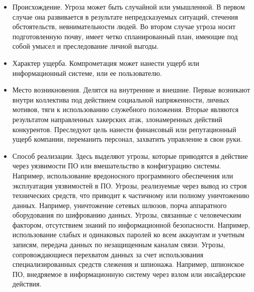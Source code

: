\begin{itemize} 

	\item Происхождение. Угроза может быть случайной или умышленной. В первом случае она развивается в результате непредсказуемых ситуаций, стечения обстоятельств, невнимательности людей. Во втором случае угроза носит подготовленную почву, имеет четко спланированный план, имеющие под собой умысел и преследование личной выгоды.

	\item Характер ущерба. Компрометация может нанести ущерб или информационный системе, или ее пользователю.

	\item Место возникновения. Делятся на внутренние и внешние. Первые возникают внутри коллектива под действием социальной напряженности, личных мотивов, тяги к использованию служебного положения. Вторые являются результатом направленных хакерских атак, злонамеренных действий конкурентов. Преследуют цель нанести финансовый или репутационный ущерб компании, переманить персонал, захватить управление в свои руки.

	\item Способ реализации. Здесь выделяют угрозы, которые приводятся в действие через уязвимости ПО или вмешательство в конфигурацию системы. Например, использование вредоносного программного обеспечения или эксплуатация уязвимостей в ПО. Угрозы, реализуемые через вывод из строя технических средств, что приводит к частичному или полному уничтожению данных. Например, уничтожение сетевых шлюзов, порча аппаратного оборудования по шифрованию данных. Угрозы, связанные с человеческим фактором, отсутствием знаний по информационной безопасности. Например, использование слабых и одинаковых паролей ко всем аккаунтам и учетным записям, передача данных по незащищенным каналам связи. Угрозы, сопровождающиеся перехватом данных за счет использования специализированных средств слежения и шпионажа. Например, шпионское ПО, внедряемое в информационную систему через взлом или инсайдерские действия.

\end{itemize}

